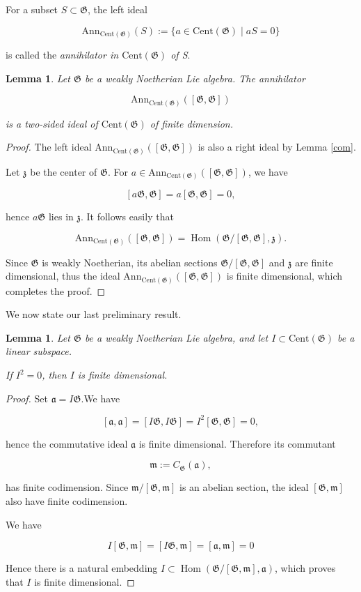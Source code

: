 \documentclass[11pt, letterpaper, reqno]{amsart}
\newtheorem{lemma}[theorem]{Lemma}
\theoremstyle{definition}
\newcommand{\Hom}{\operatorname{Hom}}
\newcommand{\fa}{\mathfrak{a}}
\newcommand{\fm}{\mathfrak{m}}
\newcommand{\fz}{\mathfrak{z}}
\newcommand{\fG}{\mathfrak{G}}
\newcommand{\Ann}{\mathrm{Ann}}
\newcommand{\Cent}{\mathrm{Cent}}
\begin{document}
For a subset $S\subset \fG$, the left ideal

$$\Ann_{\Cent(\fG)}(S):=
\{a\in \Cent(\fG)\mid aS=0\}$$

\noindent is called the {\it annihilator
in $\Cent(\fG)$ of S}.

\begin{lemma}\label{cent1} Let $\fG$ be a weakly Noetherian Lie algebra. The annihilator

$$\Ann_{\Cent(\fG)}([\fG,\fG])$$ 

\noindent is a  two-sided ideal of $\Cent(\fG)$
of finite dimension.
\end{lemma}


\begin{proof} The left ideal $\Ann_{\Cent(\fG)}
([\fG,\fG])$ is also
a right ideal by Lemma \ref{com}.

Let $\fz$ be the center of
$\fG$. 
For $a\in \Ann_{\Cent(\fG)}([\fG,\fG])$, we have

$$[a\fG,\fG]=a[\fG,\fG]=0,$$

\noindent hence $a\fG$ lies in $\fz$. It follows easily that 

$$\Ann_{\Cent(\fG)}([\fG,\fG])=\Hom(\fG/[\fG,\fG],\fz).$$ 

Since $\fG$ is
weakly Noetherian, its abelian sections $\fG/[\fG,\fG]$ and $\fz$
are finite dimensional, thus the ideal 
$\Ann_{\Cent(\fG)}([\fG,\fG])$ is finite dimensional, which completes the proof.
\end{proof}

 
 We now state our last preliminary result.

\begin{lemma}\label{cent2} Let $\fG$ be a weakly Noetherian Lie algebra, and let $I\subset \Cent(\fG)$ be a linear subspace.

If $I^2=0$, then $I$ is finite dimensional.
\end{lemma}

\begin{proof} Set $\fa= I\fG$.We have

$$[\fa,\fa]=[I\fG, I\fG]=I^2[\fG,\fG]=0,$$

\noindent hence the commutative ideal $\fa$ is finite dimensional. Therefore its commutant 

$$\fm:=C_\fG(\fa),$$

\noindent has finite codimension. Since
$\fm/[\fG,\fm]$ is an abelian section,
the ideal $[\fG,\fm]$ also have finite codimension.

We have 

$$I[\fG,\fm]=[I\fG,\fm]=[\fa,\fm]=0$$

\noindent Hence there is a natural embedding
$I\subset\Hom( \fG/[\fG,\fm],\fa)$, which proves that $I$ is finite dimensional.
\end{proof}
\end{document}
